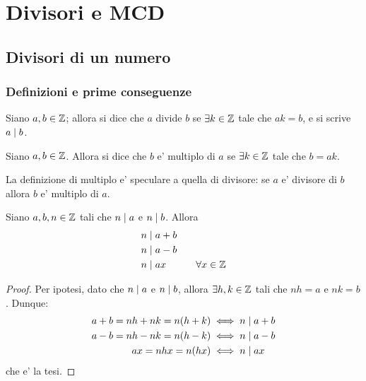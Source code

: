 \chapter{Divisori e MCD}

\section{Divisori di un numero}

\subsection{Definizioni e prime conseguenze}

\begin{definition}[Divisore]
    Siano $a, b \in \mathbb{Z}$; allora si dice che $a$ divide $b$ se
    $\exists k \in \mathbb{Z}$ tale che $ak = b$, e si scrive $a \mid b$.
\end{definition}

\begin{definition}[Multiplo]
    Siano $a, b \in \mathbb{Z}$. Allora si dice che $b$ e' multiplo di $a$ se $\exists k \in \mathbb{Z}$ tale che $b = ak$.
\end{definition}
\begin{remark}
    La definizione di multiplo e' speculare a quella di divisore: se $a$ e' divisore di $b$ allora $b$ e' multiplo di $a$.
\end{remark}

\begin{proposition} \label{divides_sum_subtr_mult}
    Siano $a, b, n \in \mathbb{Z}$ tali che $n \mid a$ e $n \mid b$. Allora
    \begin{alignat}{2}
        &n \mid a + b \label{divides_sum}\\
        &n \mid a - b \label{divides_subtr} \\
        &n \mid ax \qquad&\forall x \in \mathbb{Z} \label{divides_mult}
    \end{alignat} 
\end{proposition}
\begin{proof}  
    Per ipotesi, dato che $n \mid a$ e $n \mid b$, allora $\exists h, k \in \mathbb{Z}$ tali che
    $nh = a$ e $nk = b$. Dunque:
    \begin{alignat*}{2}
        a + b = nh + nk = n(h + k) &\iff n \mid a + b \\
        a - b = nh - nk = n(h - k) &\iff n \mid a - b \\
        ax = nhx = n(hx) &\iff n \mid ax
    \end{alignat*}
    che e' la tesi.
\end{proof}

